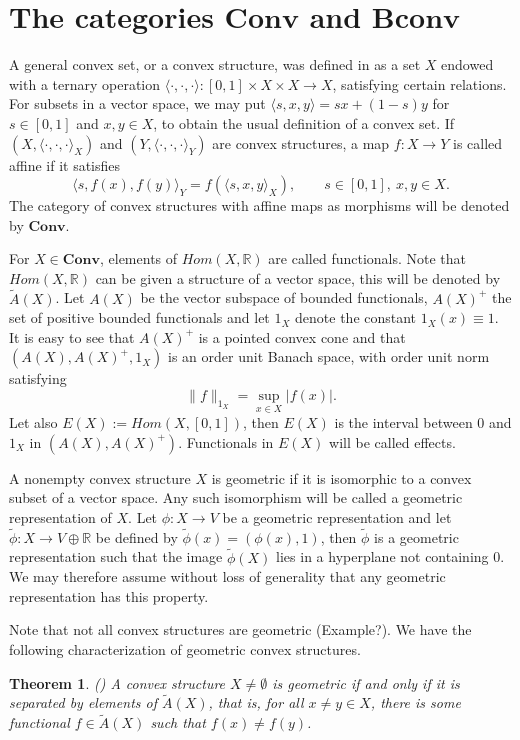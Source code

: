 \documentclass[12pt]{article}
\newtheorem{thm}{Theorem}
\newcommand{\<}{\langle}
\def\>{\rangle}
\newcommand{\ct}[1]{\mathbf{#1}}
\begin{document}
 

\section{The categories $\ct{Conv}$ and $\ct{Bconv}$}


A general convex set, or a convex structure, was defined in \cite{gudder} as a set $X$ endowed with a ternary operation $\<\cdot,\cdot,\cdot\>: [0,1]\times X\times X\to X$,
 satisfying certain relations. For subsets in a vector space, we may put $\<s,x,y\>=sx+(1-s)y$ for $s\in [0,1]$ and $x,y\in X$, to obtain the usual definition of a convex set.  If $(X,\<\cdot,\cdot,\cdot\>_X)$ and $(Y,\<\cdot,\cdot,\cdot\>_Y)$ are convex structures, a map $f:X\to Y$ is called affine if it satisfies
\[
\<s,f(x),f(y)\>_Y=f(\<s,x,y\>_X),\qquad s\in [0,1],\ x,y\in X.
\]
The category of convex structures with affine maps as morphisms will be denoted by $\ct{Conv}$. 

For $X\in \ct{Conv}$, elements of $Hom(X,\mathbb R)$ are called functionals. Note that $Hom(X,\mathbb R)$ can be given a structure of a vector space, this will be denoted by $\widetilde A(X)$.  Let $A(X)$ be the vector subspace of bounded functionals, $A(X)^+$ the set of positive bounded functionals and let $1_X$ denote the constant $1_X(x)\equiv 1$. It is easy to see that $A(X)^+$ is a pointed convex cone and that $(A(X),A(X)^+,1_X)$ is an  order unit Banach space, with order unit norm satisfying
\[
\|f\|_{1_X}=\sup_{x\in X} |f(x)|.
\]
Let also $E(X):=Hom(X,[0,1])$, then $E(X)$ is the interval between 0 and $1_X$ in $(A(X),A(X)^+)$. Functionals in  $E(X)$ will be called effects.





A nonempty convex structure $X$ is geometric if it is isomorphic to a convex subset of a vector space. Any such isomorphism will be called a geometric representation of $X$.
Let $\phi:X\to V$ be a geometric representation and let $\tilde \phi:X\to V\oplus \mathbb R$ be defined by $\tilde \phi(x)=(\phi(x),1)$, then $\tilde \phi$ is a geometric 
representation  such that the image $\tilde \phi(X)$ lies in a hyperplane not containing 0. We may therefore assume without loss of generality  that any geometric representation has this property.

 Note that not all convex structures are geometric (Example?). We have the following characterization of geometric convex structures.
\begin{thm}(\cite[Thm. 2.2]{gudder}) \label{thm:gudder} A convex structure $X\neq \emptyset$ is geometric if and only if it is separated by elements of $\widetilde A(X)$, 
that is, for all $x\ne y\in X$, there is some functional $f\in \widetilde A(X)$ such that $f(x)\ne f(y)$. 
\end{thm}
\end{document}
